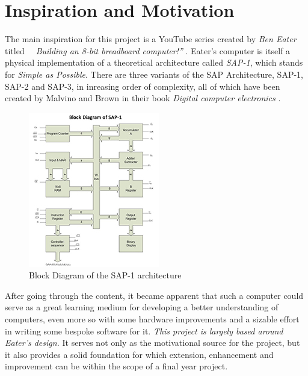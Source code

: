 \documentclass[11pt]{informatics-report}
\begin{document}
\section{Inspiration and Motivation}
The main inspiration for this project is a YouTube series created by \emph{Ben Eater} titled \emph{~~Building an 8-bit breadboard computer!''} \cite{eater2019breadboard}. Eater's computer is itself a physical implementation of a theoretical
architecture called \emph{SAP-1}, which stands for \emph{Simple as Possible}. There are three variants of the SAP Architecture, SAP-1, SAP-2 and SAP-3, in inreasing order of complexity, all of which have been created by Malvino and Brown in their book \emph{Digital computer electronics} \cite{malvino1992digital}.
\begin{figure}[ht]
  \centering
  \includegraphics{sap1}
  \caption{Block Diagram of the SAP-1 architecture}
  \label{sap1}
\end{figure}
\linebreak
After going through the content, it became apparent that such a computer could serve as a great learning medium for developing a better understanding of computers, even more so with some hardware improvements and a sizable effort in writing some bespoke software for it. \emph{This project is largely based around Eater's design.} It serves not only as the motivational source for the project, but it also provides a solid foundation for which extension, enhancement and improvement can be within the scope of a final year project.
\end{document}
